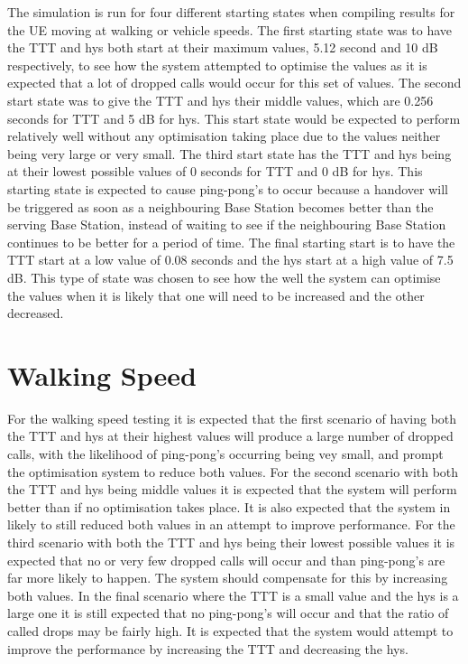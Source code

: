 The simulation is run for four different starting states when compiling results for the UE moving at walking or vehicle speeds. The first starting state was to have the TTT and hys both start at their maximum values, 5.12 second and 10 dB respectively, to see how the system attempted to optimise the values as it is expected that a lot of dropped calls would occur for this set of values. The second start state was to give the TTT and hys their middle values, which are 0.256 seconds for TTT and 5 dB for hys. This start state would be expected to perform relatively well without any optimisation taking place due to the values neither being very large or very small. The third start state has the TTT and hys being at their lowest possible values of 0 seconds for TTT and 0 dB for hys. This starting state is expected to cause ping-pong's to occur because a handover will be triggered as soon as a neighbouring Base Station becomes better than the serving Base Station, instead of waiting to see if the neighbouring Base Station continues to be better for a period of time. The final starting start is to have the TTT start at a low value of 0.08 seconds and the hys start at a high value of 7.5 dB. This type of state was chosen to see how the well the system can optimise the values when it is likely that one will need to be increased and the other decreased.
\section{Walking Speed}
For the walking speed testing it is expected that the first scenario of having both the TTT and hys at their highest values will produce a large number of dropped calls, with the likelihood of ping-pong's occurring being vey small, and prompt the optimisation system to reduce both values. For the second scenario with both the TTT and hys being middle values it is expected that the system will perform better than if no optimisation takes place. It is also expected that the system in likely to still reduced both values in an attempt to improve performance. For the third scenario with both the TTT and hys being their lowest possible values it is expected that no or very few dropped calls will occur and than ping-pong's are far more likely to happen. The system should compensate for this by increasing both values. In the final scenario where the TTT is a small value and the hys is a large one it is still expected that no ping-pong's will occur and that the ratio of called drops may be fairly high. It is expected that the system would attempt to improve the performance by increasing the TTT and decreasing the hys.
